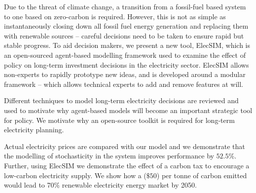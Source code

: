 Due to the threat of climate change, a transition from a fossil-fuel based system to one based on zero-carbon is required. However, this is not as simple as instantaneously closing down all fossil fuel energy generation and replacing them with renewable sources -- careful decisions need to be taken to ensure rapid but stable progress. To aid decision makers, we present a new tool, ElecSIM, which is an open-sourced agent-based modelling framework used to examine the effect of policy on long-term investment decisions in the electricity sector. ElecSIM allows non-experts to rapidly prototype new ideas, and is developed around a modular framework -- which allows technical experts to add and remove features at will. 

Different techniques to model long-term electricity decisions are reviewed and used to motivate why agent-based models will become an important strategic tool for policy. We motivate why an open-source toolkit is required for long-term electricity planning.

Actual electricity prices are compared with our model and we demonstrate that the modelling of stochasticity in the system improves performance by $52.5\%$. Further, using ElecSIM we demonstrate the effect of a carbon tax to encourage a low-carbon electricity supply. We show how a  ($\$50$) per tonne of carbon emitted would lead to 70\% renewable electricity energy market by 2050. 

